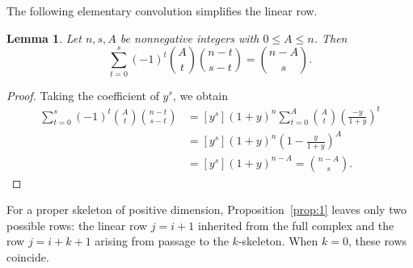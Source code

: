 \documentclass[11pt]{amsart}
\newtheorem{lemma}[theorem]{Lemma}
\theoremstyle{definition}
\theoremstyle{remark}
\begin{document}
	The following elementary convolution simplifies the linear row.
	
	\begin{lemma}\label{lem:1}
		Let $n,s,A$ be nonnegative integers with $0\le A\le n$. Then
		\[
		\sum_{t=0}^s(-1)^t\binom At\binom{n-t}{s-t}
		=
		\binom{n-A}{s}.
		\]
	\end{lemma}
	
	\begin{proof}
		Taking the coefficient of $y^s$, we obtain
		\begin{align*}
			\sum_{t=0}^s(-1)^t\binom At\binom{n-t}{s-t}
			&=[y^s](1+y)^n
			\sum_{t=0}^{A}\binom At\left(\frac{-y}{1+y}\right)^t\\
			&=[y^s](1+y)^n\left(1-\frac{y}{1+y}\right)^A\\
			&=[y^s](1+y)^{n-A}
			=\binom{n-A}{s}.
		\end{align*}
	\end{proof}
	
	For a proper skeleton of positive dimension, Proposition~\ref{prop:1} leaves only two possible rows: the linear row $j=i+1$ inherited from the full complex and the row $j=i+k+1$ arising from passage to the $k$-skeleton. When $k=0$, these rows coincide.
	
\end{document}
